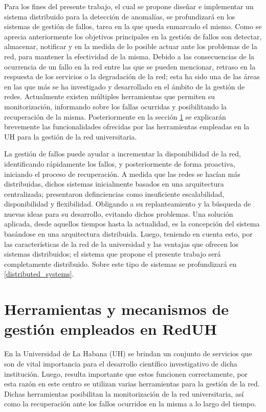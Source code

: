 Para los fines del presente trabajo, el cual se propone diseñar e implementar un
sistema distribuido para la detección de anomalías, se profundizará en los
sistemas de gestión de fallos, tarea en la que queda enmarcado el mismo. Como se
aprecia anteriormente los objetivos principales en la gestión de fallos son
detectar, almacenar, notificar y en la medida de lo posible actuar ante los
problemas de la red, para mantener la efectividad de la misma. Debido a las
consecuencias de la ocurrencia de un fallo en la red entre las que se pueden
mencionar, retraso en la respuesta de los servicios o la degradación de la red;
esta ha sido una de las áreas en las que más se ha investigado y desarrollado en
el ámbito de la gestión de redes. Actualmente existen múltiples herramientas que
permiten su monitorización, informando sobre los fallas ocurridas y
posibilitando la recuperación de la misma. Posteriormente en la sección
\ref{uhtools} se explicarán brevemente las funcionalidades ofrecidas por las
herramientas empleadas en la UH para la gestión de la red universitaria.

La gestión de fallos puede ayudar a incrementar la disponibilidad de la red,
identificando rápidamente los fallos, y posteriormente de forma proactiva,
iniciando el proceso de recuperación. A medida que las redes se hacían más
distribuidas, dichos sistemas inicialmente basados en una arquitectura
centralizada; presentaron definciencias como insuficiente escalabilidad,
disponibilidad y flexibilidad. Obligando a su replanteamiento y la búsqueda de
nuevas ideas para su desarrollo, evitando dichos problemas. Una solución
aplicada, desde aquellos tiempos hasta la actualidad, es la concepción del
sistema basándose en una arquitectura distribuida.  Luego, teniendo en cuenta
esto, por las características de la red de la universidad y las ventajas que
ofrecen los sistemas distribuidos; el sistema que propone el presente trabajo
será completamente distribuido. Sobre este tipo de sistemas se profundizará en
\ref{distributed_systems}.%

\section{Herramientas y mecanismos de gestión empleados en RedUH}
\label{uhtools}
En la Universidad de La Habana (UH) se brindan un conjunto de servicios que son
de vital importancia para el desarrollo científico investigativo de dicha
institución. Luego, resulta importante que estos funcionen correctamente, por
esta razón en este centro se utilizan varias herramientas para la gestión de la
red. Dichas herramientas posibilitan la monitorización de la red universitaria,
así como la recuperación ante los fallos ocurridos en la misma a lo largo del
tiempo. 

